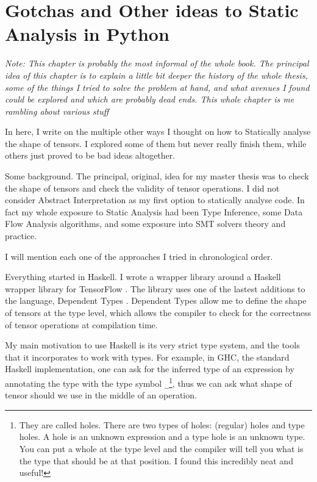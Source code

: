 \chapter{Gotchas and Other ideas to Static Analysis in Python}%
\label{gotchas-and-other-ideas-to-static-analysis-in-python}


\emph{\large Note: This chapter is probably the most informal of the whole
book. The principal idea of this chapter is to explain a little bit
deeper the history of the whole thesis, some of the things I tried to
solve the problem at hand, and what avenues I found could be explored
and which are probably dead ends. This whole chapter is me rambling
about various stuff}

In here, I write on the multiple other ways I thought on how to
Statically analyse the shape of tensors. I explored some of them but
never really finish them, while others just proved to be bad ideas
altogether.

Some background. The principal, original, idea for my master thesis was
to check the shape of tensors and check the validity of tensor
operations. I did not consider Abstract Interpretation as my first
option to statically analyse code. In fact my whole exposure to Static
Analysis had been Type Inference, some Data Flow Analysis algorithms,
and some exposure into SMT solvers theory and practice.

I will mention each one of the approaches I tried in chronological
order.

{}

Everything started in Haskell. I wrote a wrapper library around a
Haskell wrapper library for TensorFlow \autocite{abadi_tensorflow_2016}.
The library uses one of the lastest additions to the language, Dependent
Types \autocite{eisenberg_dependent_2016}. Dependent Types allow me to
define the shape of tensors at the type level, which allows the compiler
to check for the correctness of tensor operations at compilation time.

My main motivation to use Haskell is its very strict type system, and
the tools that it incorporates to work with types. For example, in GHC,
the standard Haskell implementation, one can ask for the inferred type
of an expression by annotating the type with the type symbol
\verb+_+\footnote{They are called holes. There are two types of
  holes: (regular) holes and type holes. A hole is an unknown expression
  and a type hole is an unknown type. You can put a whole at the type
  level and the compiler will tell you what is the type that should be
  at that position. I found this incredibly neat and useful!}, thus we
can ask what shape of tensor should we use in the middle of an
operation.

